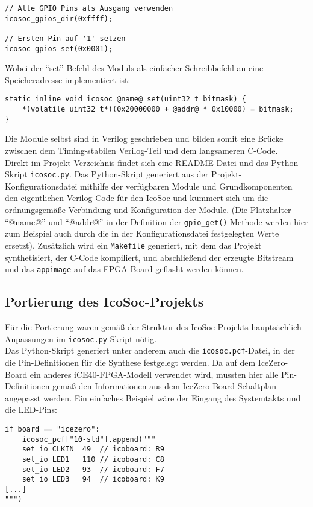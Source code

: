 {\begin{verbatim}
// Alle GPIO Pins als Ausgang verwenden
icosoc_gpios_dir(0xffff);

// Ersten Pin auf '1' setzen
icosoc_gpios_set(0x0001);
\end{verbatim}

Wobei der ``set''-Befehl des Moduls als einfacher Schreibbefehl an eine Speicheradresse implementiert ist:
\begin{verbatim}
static inline void icosoc_@name@_set(uint32_t bitmask) {
    *(volatile uint32_t*)(0x20000000 + @addr@ * 0x10000) = bitmask;
}
\end{verbatim}

Die Module selbst sind in Verilog geschrieben und bilden somit eine Brücke zwischen dem Timing-stabilen Verilog-Teil und dem langsameren C-Code.\\

Direkt im Projekt-Verzeichnis findet sich eine README-Datei und das Python-Skript {\tt icosoc.py}.
Das Python-Skript generiert aus der Projekt-Konfigurationsdatei mithilfe der verfügbaren Module und Grundkomponenten den eigentlichen Verilog-Code für den IcoSoc und kümmert sich um die ordnungsgemäße Verbindung und Konfiguration der Module. (Die Platzhalter ``@name@'' und ``@addr@'' in der Definition der {\tt gpio\_get()}-Methode werden hier zum Beispiel auch durch die in der Konfigurationsdatei festgelegten Werte ersetzt).
Zusätzlich wird ein {\tt Makefile} generiert, mit dem das Projekt synthetisiert, der C-Code kompiliert, und abschließend der erzeugte Bitstream und das {\tt appimage} auf das FPGA-Board geflasht werden können.

\subsection{Portierung des IcoSoc-Projekts}

Für die Portierung waren gemäß der Struktur des IcoSoc-Projekts hauptsächlich Anpassungen im {\tt icosoc.py} Skript nötig.\\
Das Python-Skript generiert unter anderem auch die {\tt icosoc.pcf}-Datei, in der die Pin-Definitionen für die Synthese festgelegt werden.
Da auf dem IceZero-Board ein anderes iCE40-FPGA-Modell verwendet wird, mussten hier alle Pin-Definitionen gemäß den Informationen aus dem IceZero-Board-Schaltplan\cite{doc:schematic} angepasst werden.
Ein einfaches Beispiel wäre der Eingang des Systemtakts und die LED-Pins: 
\begin{verbatim}
if board == "icezero":
    icosoc_pcf["10-std"].append("""
    set_io CLKIN  49  // icoboard: R9
    set_io LED1   110 // icoboard: C8
    set_io LED2   93  // icoboard: F7
    set_io LED3   94  // icoboard: K9
[...]
""")
\end{verbatim}

}
